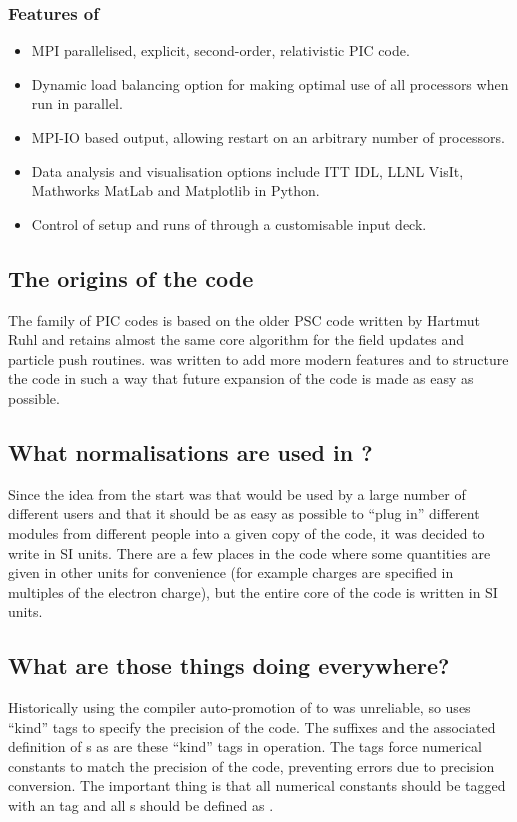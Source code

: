 \subsubsection{Features of {\EPOCH}}
\begin{itemize}
  \item MPI parallelised, explicit, second-order, relativistic PIC code.
  \item Dynamic load balancing option for making optimal use of all processors
    when run in parallel.
  \item MPI-IO based output, allowing restart on an arbitrary number of
    processors.
  \item Data analysis and visualisation options include ITT IDL, LLNL VisIt,
    Mathworks MatLab and Matplotlib in Python.
  \item Control of setup and runs of {\EPOCH} through a customisable input deck.
\end{itemize}

\subsection{The origins of the code}
The {\EPOCH} family of PIC codes is based on the older PSC code written by
Hartmut Ruhl and retains almost the same core algorithm for the field updates
and particle push routines. {\EPOCH} was written to add more modern features
and to structure the code in such a way that future expansion of the code is
made as easy as possible.

\subsection{What normalisations are used in {\EPOCH}?}
Since the idea from the start was that {\EPOCH} would be used by a large number
of different users and that it should be as easy as possible to ``plug in''
different modules from different people into a given copy of the code, it was
decided to write {\EPOCH} in SI units. There are a few places in the code where
some quantities are given in other units for convenience (for example charges
are specified in multiples of the electron charge), but the entire core of the
code is written in SI units.

\subsection{What are those  things doing everywhere?}
Historically using the compiler auto-promotion of  to
 was unreliable, so {\EPOCH} uses ``kind'' tags to
specify the precision of the code. The  suffixes and the associated
definition of s as  are these ``kind'' tags in
operation. The  tags force numerical constants to match the
precision of the code, preventing errors due to precision conversion. The
important thing is that all numerical constants should be tagged with an
 tag and all s should be defined as .

